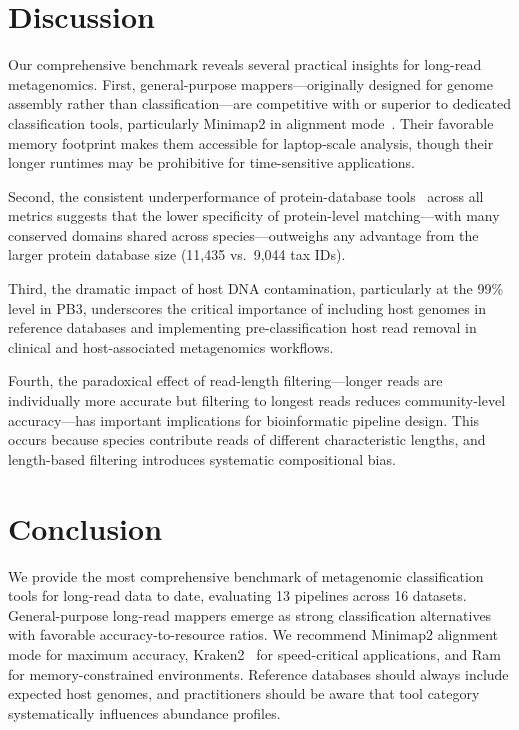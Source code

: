 \documentclass[11pt]{article}
\begin{document}
\section{Discussion}

Our comprehensive benchmark reveals several practical insights for long-read metagenomics.  First, general-purpose mappers---originally designed for genome assembly rather than classification---are competitive with or superior to dedicated classification tools, particularly Minimap2 in alignment mode~\citep{li2018minimap2}.  Their favorable memory footprint makes them accessible for laptop-scale analysis, though their longer runtimes may be prohibitive for time-sensitive applications.

Second, the consistent underperformance of protein-database tools~\citep{menzel2016kaiju} across all metrics suggests that the lower specificity of protein-level matching---with many conserved domains shared across species---outweighs any advantage from the larger protein database size (11,435 vs.\ 9,044 tax IDs).

Third, the dramatic impact of host DNA contamination, particularly at the 99\% level in PB3, underscores the critical importance of including host genomes in reference databases and implementing pre-classification host read removal in clinical and host-associated metagenomics workflows.

Fourth, the paradoxical effect of read-length filtering---longer reads are individually more accurate but filtering to longest reads reduces community-level accuracy---has important implications for bioinformatic pipeline design.  This occurs because species contribute reads of different characteristic lengths, and length-based filtering introduces systematic compositional bias.

\section{Conclusion}

We provide the most comprehensive benchmark of metagenomic classification tools for long-read data to date, evaluating 13 pipelines across 16 datasets.  General-purpose long-read mappers emerge as strong classification alternatives with favorable accuracy-to-resource ratios.  We recommend Minimap2 alignment mode for maximum accuracy, Kraken2~\citep{wood2019improved} for speed-critical applications, and Ram~\citep{vaser2021ram} for memory-constrained environments.  Reference databases should always include expected host genomes, and practitioners should be aware that tool category systematically influences abundance profiles.



\end{document}
